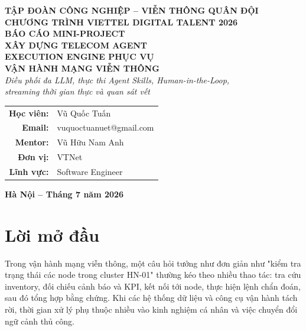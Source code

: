 \documentclass[12pt,a4paper]{article}
\makeatletter
\newcommand{\StudentName}{Vũ Quốc Tuấn}
\newcommand{\StudentEmail}{vuquoctuanuet@gmail.com}
\newcommand{\MentorName}{Vũ Hữu Nam Anh}
\newcommand{\HostUnit}{VTNet}
\newcommand{\ReportDate}{Tháng 7 năm 2026}
\makeatother
\begin{document}
\begin{titlepage}
\thispagestyle{empty}
\begin{center}
\vspace*{0.25cm}
{\large\bfseries TẬP ĐOÀN CÔNG NGHIỆP -- VIỄN THÔNG QUÂN ĐỘI}\\[0.2cm]
{\large\bfseries CHƯƠNG TRÌNH VIETTEL DIGITAL TALENT 2026}\\[1.7cm]
{\Large\bfseries BÁO CÁO MINI-PROJECT}\\[0.8cm]
{\LARGE\bfseries\color{diagramblue} XÂY DỰNG TELECOM AGENT\\[0.18cm] EXECUTION ENGINE PHỤC VỤ\\[0.18cm] VẬN HÀNH MẠNG VIỄN THÔNG}\\[0.65cm]
{\large\itshape Điều phối đa LLM, thực thi Agent Skills, Human-in-the-Loop,\\ streaming thời gian thực và quan sát vết}\\[1.5cm]
\begin{tabular}{rl}
\textbf{Học viên:} & \StudentName \\
\textbf{Email:} & \StudentEmail \\
\textbf{Mentor:} & \MentorName \\
\textbf{Đơn vị:} & \HostUnit \\
\textbf{Lĩnh vực:} & Software Engineer \\
\end{tabular}
\vfill
{\large\bfseries Hà Nội -- \ReportDate}
\end{center}
\end{titlepage}

\setcounter{page}{1}
\section*{Lời mở đầu}
Trong vận hành mạng viễn thông, một câu hỏi tưởng như đơn giản như "kiểm tra trạng thái các node trong cluster HN-01" thường kéo theo nhiều thao tác: tra cứu inventory, đối chiếu cảnh báo và KPI, kết nối tới node, thực hiện lệnh chẩn đoán, sau đó tổng hợp bằng chứng. Khi các hệ thống dữ liệu và công cụ vận hành tách rời, thời gian xử lý phụ thuộc nhiều vào kinh nghiệm cá nhân và việc chuyển đổi ngữ cảnh thủ công.
\end{document}
